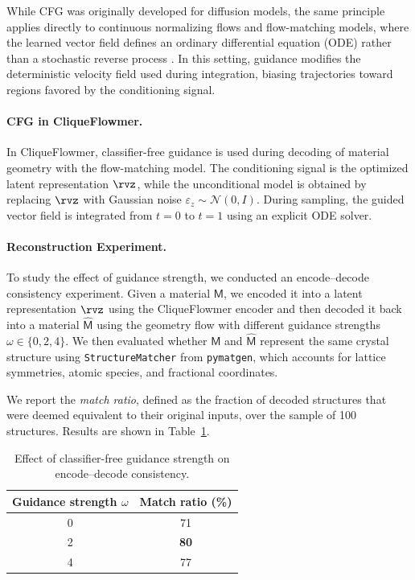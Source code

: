 \documentclass{article}
\theoremstyle{plain}
\theoremstyle{definition}
\theoremstyle{remark}
\begin{document}
While CFG was originally developed for diffusion models, the same principle applies directly to continuous normalizing flows and flow-matching models, where the learned vector field defines an ordinary differential equation (ODE) rather than a stochastic reverse process \citep{lipman2022flow}. In this setting, guidance modifies the deterministic velocity field used during integration, biasing trajectories toward regions favored by the conditioning signal.

\paragraph{CFG in CliqueFlowmer.}
In CliqueFlowmer, classifier-free guidance is used during decoding of material geometry with the flow-matching model. The conditioning signal is the optimized latent representation $\rvz$, while the unconditional model is obtained by replacing $\rvz$ with Gaussian noise $\varepsilon_z \sim \mathcal{N}(0, I)$. During sampling, the guided vector field is integrated from $t=0$ to $t=1$ using an explicit ODE solver.

\paragraph{Reconstruction Experiment.}
To study the effect of guidance strength, we conducted an encode--decode consistency experiment. Given a material $\mathsf{M}$, we encoded it into a latent representation $\rvz$ using the CliqueFlowmer encoder and then decoded it back into a material $\hat{\mathsf{M}}$ using the geometry flow with different guidance strengths $\omega \in \{0, 2, 4\}$. We then evaluated whether $\mathsf{M}$ and $\hat{\mathsf{M}}$ represent the same crystal structure using \texttt{StructureMatcher} from \texttt{pymatgen}, which accounts for lattice symmetries, atomic species, and fractional coordinates.

We report the \emph{match ratio}, defined as the fraction of decoded structures that were deemed equivalent to their original inputs, over the sample of 100 structures. Results are shown in Table~\ref{tab:cfg-results}.

\begin{table}
\centering
\caption{Effect of classifier-free guidance strength on encode--decode consistency.}
\label{tab:cfg-results}
\begin{tabular}{c c}
\toprule
Guidance strength $\omega$ & Match ratio (\%) \\
\midrule
0 & 71 \\
2 & \textbf{80} \\
4 & 77 \\
\bottomrule
\end{tabular}
\end{table}
\end{document}
